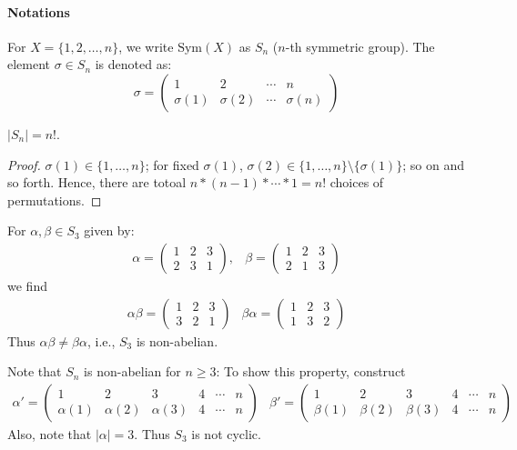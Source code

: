 \paragraph{Notations}
For $X=\{1,2,\dots,n\}$, we write $\mbox{Sym}(X)$ as $S_n$ ($n$-th symmetric group). The element $\sigma\in S_n$ is denoted as:
\[
\sigma=\begin{pmatrix}
1&2&\cdots&n\\
\sigma(1)&\sigma(2)&\cdots&\sigma(n)
\end{pmatrix}
\]
\begin{proposition}
$|S_n| = n!$.
\end{proposition}
\begin{proof}
$\sigma(1)\in\{1,\dots,n\}$; for fixed $\sigma(1)$, $\sigma(2)\in \{1,\dots,n\}\setminus\{\sigma(1)\}$; so on and so forth. Hence, there are totoal $n*(n-1)*\cdots*1=n!$ choices of permutations.
\end{proof}
\begin{example}
For $\alpha,\beta\in S_3$ given by:
\[
\begin{array}{ll}
\alpha=\begin{pmatrix}
1&2&3\\2&3&1
\end{pmatrix},&
\beta = \begin{pmatrix}
1&2&3\\2&1&3
\end{pmatrix}
\end{array}
\]
we find
\[
\begin{array}{ll}
\alpha\beta=
\begin{pmatrix}
1&2&3\\
3&2&1
\end{pmatrix}
&
\beta\alpha=
\begin{pmatrix}
1&2&3\\
1&3&2
\end{pmatrix}
\end{array}
\]
Thus $\alpha\beta\ne\beta\alpha$, i.e., $S_3$ is non-abelian.
\end{example}
Note that $S_n$ is non-abelian for $n\ge3$: To show this property, construct
\[
\begin{array}{ll}
\alpha'=\begin{pmatrix}
1&2&3&4&\cdots&n\\
\alpha(1)&\alpha(2)&\alpha(3)&4&\cdots&n
\end{pmatrix}
&
\beta'=\begin{pmatrix}
1&2&3&4&\cdots&n\\
\beta(1)&\beta(2)&\beta(3)&4&\cdots&n
\end{pmatrix}
\end{array}
\]
Also, note that $|\alpha|=3$. Thus $S_3$ is not cyclic.

